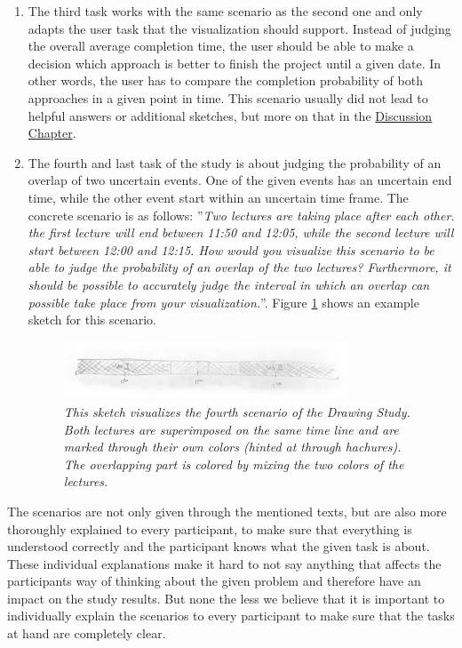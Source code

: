 \begin{enumerate}
	\item The third task works with the same scenario as the second one and only adapts the user task that the visualization should support. Instead of judging the overall average completion time, the user should be able to make a decision which approach is better to finish the project until a given date. In other words, the user has to compare the completion probability of both approaches in a given point in time. This scenario usually did not lead to helpful answers or additional sketches, but more on that in the \hyperref[ch:discussion]{Discussion Chapter}.
	
	\item The fourth and last task of the study is about judging the probability of an overlap of two uncertain events. One of the given events has an uncertain end time, while the other event start within an uncertain time frame. The concrete scenario is as follows: ''\textit{Two lectures are taking place after each other. the first lecture will end between 11:50 and 12:05, while the second lecture will start between 12:00 and 12:15. How would you visualize this scenario to be able to judge the probability of an overlap of the two lectures? Furthermore, it should be possible to accurately judge the interval in which an overlap can possible take place from your visualization.}''. Figure \ref{fig:drawingT4} shows an example sketch for this scenario.
	
	\begin{figure}[H]
		\centering
		\includegraphics[width=0.8\textwidth]{figures/drawingT4.png}
		\caption{\textit{This sketch visualizes the fourth scenario of the Drawing Study. Both lectures are superimposed on the same time line and are marked through their own colors (hinted at through hachures). The overlapping part is colored by mixing the two colors of the lectures.}}
		\label{fig:drawingT4}
	\end{figure}
\end{enumerate} 

The scenarios are not only given through the mentioned texts, but are also more thoroughly explained to every participant, to make sure that everything is understood correctly and the participant knows what the given task is about. These individual explanations make it hard to not say anything that affects the participants way of thinking about the given problem and therefore have an impact on the study results. But none the less we believe that it is important to individually explain the scenarios to every participant to make sure that the tasks at hand are completely clear. \par \medskip

